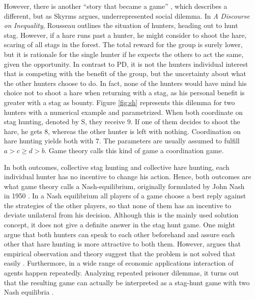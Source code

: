 However, there is 
another ``story that became a game'' \parencite[1]{skyrms_stag_2004}, 
which describes a different, but as Skyrms argues, 
underrepresented social dilemma. In \textit{A Discourse on Inequality}, 
Rousseau outlines the situation of hunters, heading out to hunt 
stag. However, if a hare runs past a hunter, he might consider to
shoot the hare, scaring of all stags in the forest. The total reward for
the group is surely lower, but it is rationale for the single hunter if he
expects the others to act the same, given the opportunity. In contrast
to PD, it is not the hunters individual interest that is competing with the
benefit of the group, but the uncertainty about what the other hunters choose
to do. In fact, none of the hunters would have mind his choice
not to shoot a hare when returning with a stag, as his personal benefit is 
greater with a stag as bounty. Figure \ref{fig:sh} represents this dilemma 
for two hunters with a numerical example and parametrized. 
When both coordinate on stag hunting, denoted by S, they receive 
$9$. If one of them decides to shoot the hare, he gets $8$, whereas
the other hunter is left with nothing. Coordination on hare
hunting yields both with $7$. The parameters are usually assumed to fulfill
$a > c \geq d >b$. 
Game theory calls this kind of game a coordination game.

In both outcomes, collective stag hunting and collective hare hunting,
each individual hunter has no incentive to change his action.
Hence, both outcomes are what game theory calls a Nash-equilibrium, originally
formulated by John Nash in 1950 \parencite{nash_equilibrium_1950}. In a 
Nash equilibrium all players of a game choose a best reply against
the strategies of the other players, so that none of them has an incentive
to deviate unilateral from his decision. Although this is the mainly used
solution concept, it does not give a definite answer in the stag hunt game.
One might argue that both hunters can speak to each other beforehand and
assure each other that hare hunting is more attractive to both them. 
However, \textcite{camerer_behavioral_2003}
argues that empirical observation and theory suggest that the problem is 
not solved that easily .
Furthermore, in a wide range of economic applications interaction of agents
happen repeatedly. Analyzing repeated prisoner dilemmas, it turns 
out that the resulting game can actually be interpreted as a stag-hunt game with
two Nash equilibria \parencite{skyrms_stag_2004}.

